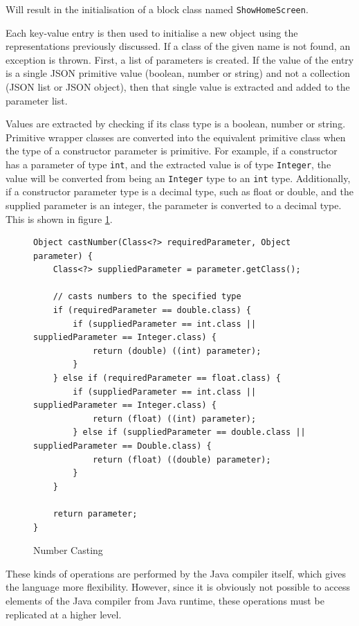 Will result in the initialisation of a block class named \texttt{ShowHomeScreen}.\par
Each key-value entry is then used to initialise a new object using the representations previously discussed. If a class of the given name is not found, an exception is thrown. First, a list of parameters is created. If the value of the entry is a single JSON primitive value (boolean, number or string) and not a collection (JSON list or JSON object), then that single value is extracted and added to the parameter list.\par
Values are extracted by checking if its class type is a boolean, number or string. Primitive wrapper classes  are converted into the equivalent primitive class when the type of a constructor parameter is primitive. For example, if a constructor has a parameter of type \texttt{int}, and the extracted value is of type \texttt{Integer}, the value will be converted from being an \texttt{Integer} type to an \texttt{int} type. Additionally, if a constructor parameter type is a decimal type, such as float or double, and the supplied parameter is an integer, the parameter is converted to a decimal type. This is shown in figure  \ref{fig:number_cast}.
\begin{figure}
\centering
\caption{Number Casting}
\label{fig:number_cast}
\begin{verbatim}
Object castNumber(Class<?> requiredParameter, Object parameter) {
    Class<?> suppliedParameter = parameter.getClass();

    // casts numbers to the specified type
    if (requiredParameter == double.class) {
        if (suppliedParameter == int.class || 
suppliedParameter == Integer.class) {
            return (double) ((int) parameter);
        }
    } else if (requiredParameter == float.class) {
        if (suppliedParameter == int.class || 
suppliedParameter == Integer.class) {
            return (float) ((int) parameter);
        } else if (suppliedParameter == double.class || 
suppliedParameter == Double.class) {
            return (float) ((double) parameter);
        }
    }

    return parameter;
}
\end{verbatim}
\end{figure}

These kinds of operations are performed by the Java compiler itself, which gives the language more flexibility. However, since it is obviously not possible to access elements of the Java compiler from Java runtime, these operations must be replicated at a higher level.\par

